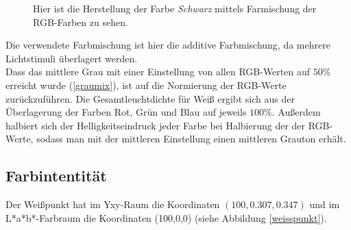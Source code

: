 \documentclass[11pt]{article}
\begin{document}
{\begin{minipage}[t]{0.6\textwidth}
\begin{figure}[H]
\caption{Hier ist die Herstellung der Farbe \textit{Schwarz} mittels Farmischung der RGB-Farben zu sehen.}
\label{schwarzmix}
\end{figure}
\end{minipage}  }
Die verwendete Farbmischung ist hier die additive Farbmischung, da mehrere Lichtstimuli überlagert werden. \\

Dass das mittlere Grau mit einer Einstellung von allen RGB-Werten auf $50\%$ erreicht wurde (\ref{graumix}), ist auf die Normierung der RGB-Werte zurückzuführen. Die Gesamtleuchtdichte für Weiß ergibt sich aus der Überlagerung der Farben Rot, Grün und Blau auf jeweils $100\%$. Außerdem halbiert sich der Helligkeitseindruck jeder Farbe bei Halbierung der der RGB-Werte, sodass man mit der mittleren Einstellung einen mittleren Grauton erhält. 


\subsection{Farbintentität}
Der Weißpunkt hat im Yxy-Raum die Koordinaten $(100,0.307,0.347)$ und im L*a*b*-Farbraum die Koordinaten (100,0,0) (siehe Abbildung \ref{weisspunkt}).  \\
\end{document}
